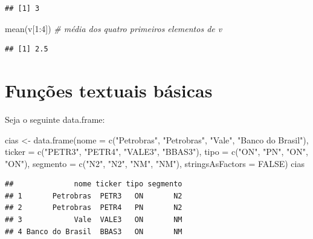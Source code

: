 \documentclass[
]{book}
\newenvironment{Shaded}{\begin{snugshade}}{\end{snugshade}}
\newcommand{\AttributeTok}[1]{\textcolor[rgb]{0.77,0.63,0.00}{#1}}
\newcommand{\CommentTok}[1]{\textcolor[rgb]{0.56,0.35,0.01}{\textit{#1}}}
\newcommand{\ConstantTok}[1]{\textcolor[rgb]{0.00,0.00,0.00}{#1}}
\newcommand{\DecValTok}[1]{\textcolor[rgb]{0.00,0.00,0.81}{#1}}
\newcommand{\FunctionTok}[1]{\textcolor[rgb]{0.00,0.00,0.00}{#1}}
\newcommand{\NormalTok}[1]{#1}
\newcommand{\OtherTok}[1]{\textcolor[rgb]{0.56,0.35,0.01}{#1}}
\newcommand{\SpecialCharTok}[1]{\textcolor[rgb]{0.00,0.00,0.00}{#1}}
\newcommand{\StringTok}[1]{\textcolor[rgb]{0.31,0.60,0.02}{#1}}
\begin{document}
\begin{verbatim}
## [1] 3
\end{verbatim}

\begin{Shaded}
\begin{Highlighting}[]
\FunctionTok{mean}\NormalTok{(v[}\DecValTok{1}\SpecialCharTok{:}\DecValTok{4}\NormalTok{]) }\CommentTok{\# média dos quatro primeiros elementos de v}
\end{Highlighting}
\end{Shaded}

\begin{verbatim}
## [1] 2.5
\end{verbatim}

\hypertarget{funuxe7uxf5es-textuais-buxe1sicas}{%
\section{Funções textuais básicas}\label{funuxe7uxf5es-textuais-buxe1sicas}}

Seja o seguinte data.frame:

\begin{Shaded}
\begin{Highlighting}[]
\NormalTok{cias }\OtherTok{\textless{}{-}} \FunctionTok{data.frame}\NormalTok{(}\AttributeTok{nome =} \FunctionTok{c}\NormalTok{(}\StringTok{"Petrobras"}\NormalTok{, }\StringTok{"Petrobras"}\NormalTok{, }\StringTok{"Vale"}\NormalTok{, }\StringTok{"Banco do Brasil"}\NormalTok{),}
                   \AttributeTok{ticker =} \FunctionTok{c}\NormalTok{(}\StringTok{"PETR3"}\NormalTok{, }\StringTok{"PETR4"}\NormalTok{, }\StringTok{"VALE3"}\NormalTok{, }\StringTok{"BBAS3"}\NormalTok{),}
                   \AttributeTok{tipo =} \FunctionTok{c}\NormalTok{(}\StringTok{"ON"}\NormalTok{, }\StringTok{"PN"}\NormalTok{, }\StringTok{"ON"}\NormalTok{, }\StringTok{"ON"}\NormalTok{),}
                   \AttributeTok{segmento =} \FunctionTok{c}\NormalTok{(}\StringTok{"N2"}\NormalTok{, }\StringTok{"N2"}\NormalTok{, }\StringTok{"NM"}\NormalTok{, }\StringTok{"NM"}\NormalTok{),}
                   \AttributeTok{stringsAsFactors =} \ConstantTok{FALSE}\NormalTok{)}
\NormalTok{cias}
\end{Highlighting}
\end{Shaded}

\begin{verbatim}
##              nome ticker tipo segmento
## 1       Petrobras  PETR3   ON       N2
## 2       Petrobras  PETR4   PN       N2
## 3            Vale  VALE3   ON       NM
## 4 Banco do Brasil  BBAS3   ON       NM
\end{verbatim}
\end{document}
